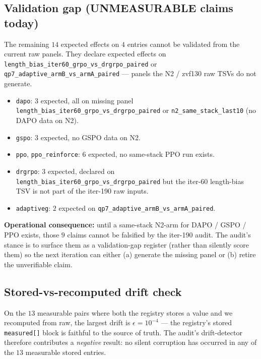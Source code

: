 \documentclass{article}
\begin{document}
\subsection{Validation gap (UNMEASURABLE claims today)}
The remaining $14$ expected effects on $4$ entries cannot be validated
from the current raw panels. They declare expected effects on
\texttt{length\_bias\_iter60\_grpo\_vs\_drgrpo\_paired} or
\texttt{qp7\_adaptive\_armB\_vs\_armA\_paired} --- panels the N2 /
zvf130 raw TSVs do not generate.

\begin{itemize}
  \item \texttt{dapo}: $3$ expected, all on missing panel
    \texttt{length\_bias\_iter60\_grpo\_vs\_drgrpo\_paired} or
    \texttt{n2\_same\_stack\_last10} (no DAPO data on N2).
  \item \texttt{gspo}: $3$ expected, no GSPO data on N2.
  \item \texttt{ppo}, \texttt{ppo\_reinforce}: $6$ expected, no
    same-stack PPO run exists.
  \item \texttt{drgrpo}: $3$ expected, declared on
    \texttt{length\_bias\_iter60\_grpo\_vs\_drgrpo\_paired} but the
    iter-60 length-bias TSV is not part of the iter-190 raw inputs.
  \item \texttt{adaptiveg}: $2$ expected on
    \texttt{qp7\_adaptive\_armB\_vs\_armA\_paired}.
\end{itemize}

\noindent\textbf{Operational consequence:} until a same-stack N2-arm
for DAPO / GSPO / PPO exists, those $9$ claims cannot be falsified by
the iter-190 audit. The audit's stance is to surface them as a
validation-gap register (rather than silently score them) so the
next iteration can either (a) generate the missing panel or (b)
retire the unverifiable claim.

\subsection{Stored-vs-recomputed drift check}
On the $13$ measurable pairs where both the registry stores a value
and we recomputed from raw, the largest drift is $\epsilon{=}10^{-4}$
--- the registry's stored \texttt{measured[]} block is faithful to the
source of truth. The audit's drift-detector therefore contributes a
\emph{negative} result: no silent corruption has occurred in any of
the $13$ measurable stored entries.
\end{document}
